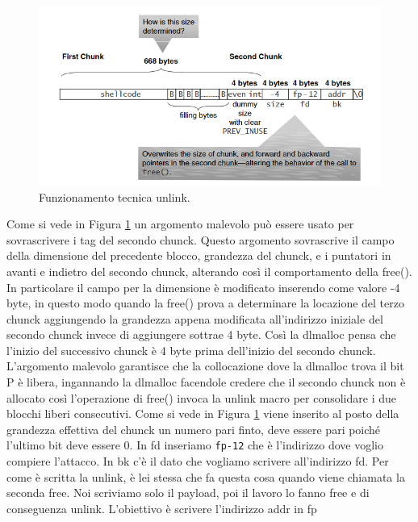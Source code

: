 \begin{figure}[H] 
	\centering
    \includegraphics[width=15cm, keepaspectratio]{santini/img/cap_4/funzionamento_unlink.png}
	\caption{Funzionamento tecnica unlink.}\label{fig:funzionamento_unlink}
\end{figure}
Come si vede in Figura \ref{fig:funzionamento_unlink} un argomento malevolo può essere usato per sovrascrivere i tag del secondo chunck. Questo argomento sovrascrive il campo della dimensione del precedente blocco, grandezza del chunck, e i puntatori in avanti e indietro del secondo chunck, alterando così il comportamento della free(). In particolare il campo per la dimensione è modificato inserendo come valore -4 byte, in questo modo quando la free() prova a determinare la locazione del terzo chunck aggiungendo la grandezza appena modificata all'indirizzo iniziale del secondo chunck invece di aggiungere sottrae 4 byte. Così la dlmalloc pensa che l'inizio del successivo chunck è 4 byte prima dell'inizio del secondo chunck. L'argomento malevolo garantisce che la collocazione dove la dlmalloc trova il bit P è libera, ingannando la dlmalloc facendole credere che il secondo chunck non è allocato così l'operazione di free() invoca la unlink macro per consolidare i due blocchi liberi consecutivi. Come si vede in Figura \ref{fig:funzionamento_unlink} viene inserito al posto della grandezza effettiva del chunck un numero pari finto, deve essere pari poiché l'ultimo bit deve essere 0.  In fd inseriamo \verb|fp-12| che è l’indirizzo dove voglio compiere l’attacco. In bk c’è il dato che vogliamo scrivere all’indirizzo fd.
Per come è scritta la unlink, è lei stessa che fa questa cosa quando viene chiamata la seconda free. Noi scriviamo solo il payload, poi il lavoro lo fanno free e di conseguenza unlink. L'obiettivo è scrivere l'indirizzo addr in fp

